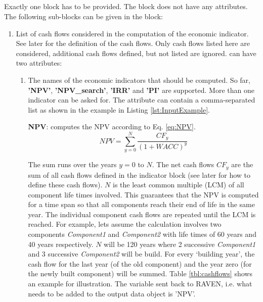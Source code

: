 \subsection{}
Exactly one  block has to be provided. The  block does not have any attributes. The following sub-blocks can be given in the  block:

\begin{enumerate}
\item[\xmlNode{Indicator}] List of cash flows considered in the computation of the economic indicator. See later for the definition
 of the cash flows. Only cash flows listed here are considered, additional cash flows defined, but not listed are ignored. 
 can have two attributes:
  \begin{enumerate}
  \item[\xmlAttr{name}] The names of the economic indicators that should be computed. So far, \textbf{'NPV'}, \textbf{'NPV\_search'}, \textbf{'IRR'} and \textbf{'PI'} are supported. More than one indicator can be asked for. 
The  attribute can contain a comma-separated list as shown in the example in Listing \ref{lst:InputExample}.

\textbf{NPV}: computes the NPV according to Eq. \ref{eq:NPV}.
\begin{equation}\label{eq:NPV}
NPV=\sum_{y=0}^{N}\frac{CF_{y}}{(1+WACC)^{y}}
\end{equation}

The sum runs over the years $y=0$ to $N$. The net cash flows $CF_{y}$ are the sum of all cash flows defined in the indicator block (see later for how to define these cash flows). 
$N$ is the least common multiple (LCM) of all component life times involved. This guarantees that the NPV is computed for a time span so that all components reach their end of life in the same year. 
The individual component cash flows are repeated until the LCM is reached. For example, lets assume the calculation involves two components \textit{Component1} and \textit{Component2}
 with life times of 60 years and 40 years respectively. $N$ will be 120 years where 2 successive \textit{Component1} and 3 successive \textit{Component2} will be build. For every ‘building year’, 
the cash flow for the last year (of the old component) and the year zero (for the newly built component) will be summed. Table \ref{tbl:cashflows} shows an example for illustration.
The variable sent back to RAVEN, i.e. what needs to be added to the output data object is 'NPV'.


\end{enumerate}
\end{enumerate}
